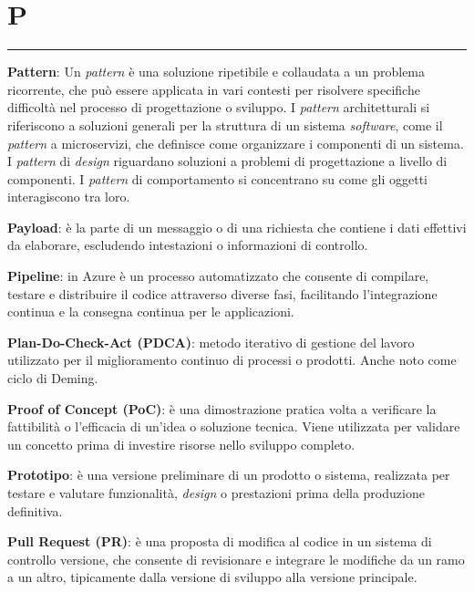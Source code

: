 \section*{P}
{\color{lightgray}\rule{\textwidth}{0.4pt}} %
\begin{glossaryitemize}
    \item \textbf{Pattern}: Un \textit{pattern} è una soluzione ripetibile e collaudata a un problema ricorrente, che può essere applicata in vari contesti per risolvere specifiche difficoltà nel processo di progettazione o sviluppo.  I \textit{pattern} architetturali si riferiscono a soluzioni generali per la struttura di un sistema \textit{software}, come il \textit{pattern} a microservizi, che definisce come organizzare i componenti di un sistema. I \textit{pattern} di \textit{design} riguardano soluzioni a problemi di progettazione a livello di componenti. I \textit{pattern} di comportamento si concentrano su come gli oggetti interagiscono tra loro.
    \item \textbf{Payload}: è la parte di un messaggio o di una richiesta che contiene i dati effettivi da elaborare, escludendo intestazioni o informazioni di controllo.
    \item \textbf{Pipeline}: in Azure è un processo automatizzato che consente di compilare, testare e distribuire il codice attraverso diverse fasi, facilitando l'integrazione continua e la consegna continua per le applicazioni.
    \item \textbf{Plan-Do-Check-Act (PDCA)}: metodo iterativo di gestione del lavoro utilizzato per il miglioramento continuo di processi o prodotti. Anche noto come ciclo di Deming.
    \item \textbf{Proof of Concept (PoC)}: è una dimostrazione pratica volta a verificare la fattibilità o l'efficacia di un'idea o soluzione tecnica. Viene utilizzata per validare un concetto prima di investire risorse nello sviluppo completo.
    \item \textbf{Prototipo}: è una versione preliminare di un prodotto o sistema, realizzata per testare e valutare funzionalità, \textit{design} o prestazioni prima della produzione definitiva.
    \item \textbf{Pull Request (PR)}: è una proposta di modifica al codice in un sistema di controllo versione, che consente di revisionare e integrare le modifiche da un ramo a un altro, tipicamente dalla versione di sviluppo alla versione principale.
\end{glossaryitemize}

